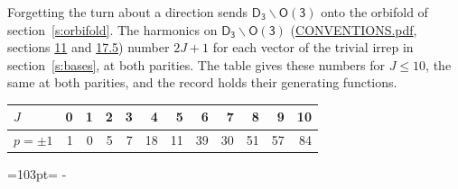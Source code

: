 \documentclass[10pt,a4paper]{article}
\newcommand{\needspace}[1]{\par\penalty-100\begingroup\dimen0=#1\relax\dimen2=\pagegoal
  \advance\dimen2-\pagetotal\ifdim\dimen0>\dimen2\relax\ifdim\dimen2>0pt\vfil\break\fi\fi
  \endgroup}
\numberwithin{equation}{section}
\newcommand{\grp}[1]{\mathsf{#1}}
\begin{document}
Forgetting the turn about a direction sends $\grp{D_{3}}\backslash\grp{O(3)}$ onto the orbifold of section~\ref{s:orbifold}.
The harmonics on $\grp{D_{3}}\backslash\grp{O(3)}$ (\href{../../CONVENTIONS.pdf}{CONVENTIONS.pdf}, sections \href{../../CONVENTIONS.pdf\#conv.11}{11} and \href{../../CONVENTIONS.pdf\#conv.17.5}{17.5}) number $2J + 1$ for each vector of the trivial irrep in section~\ref{s:bases}, at both parities. The table gives these numbers for $J \le 10$, the same at both parities, and the record holds their generating functions.
{\small\setlength{\tabcolsep}{4pt}\begin{longtable}{@{}lrrrrrrrrrrr@{}}\toprule
$J$ & 0 & 1 & 2 & 3 & 4 & 5 & 6 & 7 & 8 & 9 & 10\\\midrule\endhead
\bottomrule\endfoot\endlastfoot
$p = \pm 1$ & 1 & 0 & 5 & 7 & 18 & 11 & 39 & 30 & 51 & 57 & 84\\
\bottomrule\end{longtable}}
\needspace{103pt}
\end{document}
